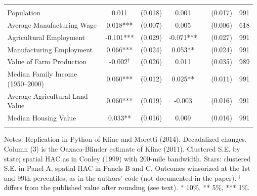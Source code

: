\begin{table}[htbp]
\begin{tabular}{lcccccc}
\addlinespace
\multicolumn{7}{l}{\textit{Panel C: TVA vs. proposed authorities}} \\
Population & 0.011 & (0.018) & 0.001 &  & (0.017) & 991 \\
Average Manufacturing Wage & 0.018*** & (0.007) & 0.005 &  & (0.006) & 618 \\
Agricultural Employment & -0.101*** & (0.029) & -0.071*** &  & (0.027) & 991 \\
Manufacturing Employment & 0.066*** & (0.024) & 0.053** &  & (0.024) & 991 \\
Value of Farm Production & -0.002$^\dagger$ & (0.026) & 0.011 &  & (0.035) & 989 \\
Median Family Income (1950--2000) & 0.060*** & (0.012) & 0.025** &  & (0.011) & 991 \\
Average Agricultural Land Value & 0.060*** & (0.019) & -0.003 &  & (0.016) & 991 \\
Median Housing Value & 0.033** & (0.016) & 0.009 &  & (0.016) & 991 \\
\addlinespace
\bottomrule
\end{tabular}
\begin{minipage}{0.95\textwidth}\vspace{4pt}\scriptsize Notes: Replication in Python of Kline and Moretti (2014). Decadalized changes. Column (3) is the Oaxaca-Blinder estimate of Kline (2011). Clustered S.E. by state; spatial HAC as in Conley (1999) with 200-mile bandwidth. Stars: clustered S.E. in Panel A, spatial HAC in Panels B and C. Outcomes winsorized at the 1st and 99th percentiles, as in the authors' code (not documented in the paper). $^\dagger$ differs from the published value after rounding (see text). * 10\%, ** 5\%, *** 1\%.\end{minipage}
\end{table}